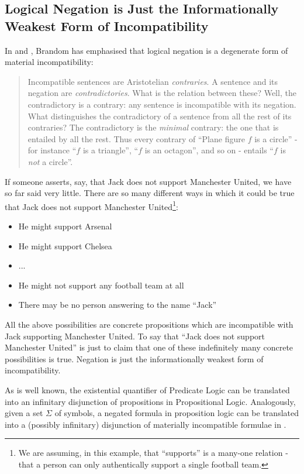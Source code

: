 \subsection{Logical Negation is Just the Informationally Weakest Form of Incompatibility}

In \cite{brandom2} and \cite{brandom}, Brandom has emphasised that logical negation is a degenerate form of material incompatibility:
\begin{quote}
Incompatible sentences are Aristotelian \emph{contraries}. A sentence and its negation are \emph{contradictories}. What is the relation between these? Well, the contradictory is a contrary: any sentence is incompatible with its negation. What distinguishes the contradictory of a sentence  from all the rest of its contraries? The contradictory is the \emph{minimal} contrary: the one that is entailed by all the rest. Thus every contrary of ``Plane figure $f$ is a circle'' - for instance ``$f$ is a triangle'', ``$f$ is an octagon'', and so on - entails ``$f$ is \emph{not} a circle''.
\end{quote}

If someone asserts, say, that Jack does not support Manchester United, we have so far said very little.  
There are so many different ways in which it could be true that Jack does not support Manchester United\footnote{We are assuming, in this example, that ``supports'' is a many-one relation - that a person can only authentically support a single football team.}:
\begin{itemize}
\item
He might support Arsenal
\item
He might support Chelsea
\item
...
\item
He might not support any football team at all
\item
There may be no person answering to the name ``Jack''
\end{itemize}
All the above possibilities are concrete propositions which are incompatible with Jack supporting Manchester United.
To say that ``Jack does not support Manchester United'' is just to claim that one of these indefinitely many concrete possibilities is true.
Negation is just the informationally weakest form of incompatibility.

As is well known, the existential quantifier of Predicate Logic can be translated into an infinitary disjunction of propositions in Propositional Logic.
Analogously, given a set $\Sigma$ of symbols, a negated formula in proposition logic can be translated into a (possibly infinitary)
disjunction of materially incompatible formulae in \ELFULL{}.

